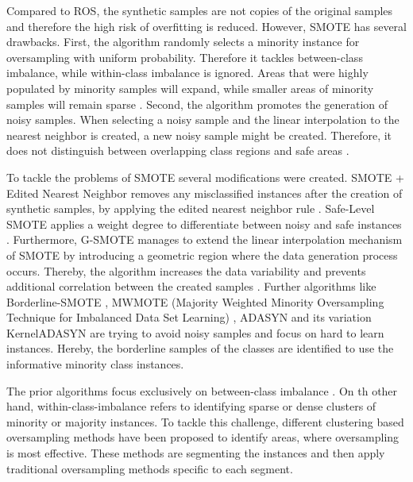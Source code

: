 \documentclass[parskip=full]{scrartcl}
\begin{document}
Compared to ROS, the synthetic samples are not copies of the original samples and therefore the high risk of overfitting is reduced. However, SMOTE has several drawbacks. First, the algorithm randomly selects a minority instance for oversampling with uniform probability. Therefore it tackles between-class imbalance, while within-class imbalance is ignored. Areas that were highly populated by minority samples will expand, while smaller areas of minority samples will remain sparse \cite{Prati2004}. Second, the algorithm promotes the generation of noisy samples. When selecting a noisy sample and the linear interpolation to the nearest neighbor is created, a new noisy sample might be created. Therefore, it does not distinguish between overlapping class regions and safe areas \cite{Bunkhumpornpat2009}.

To tackle the problems of SMOTE several modifications were created. SMOTE + Edited Nearest Neighbor removes any misclassified instances after the creation of synthetic samples, by applying the edited nearest neighbor rule \cite{Batista2004}. Safe-Level SMOTE applies a weight degree to differentiate between noisy and safe instances \cite{Bunkhumpornpat2009}. Furthermore, G-SMOTE manages to extend the linear interpolation mechanism of SMOTE by introducing a geometric region where the data generation process occurs. Thereby, the algorithm increases the data variability and prevents additional correlation between the created samples \cite{Douzas2019}. Further algorithms like Borderline-SMOTE \cite{Han2005}, MWMOTE (Majority Weighted Minority Oversampling Technique for Imbalanced Data Set Learning) \cite{Barua2014}, ADASYN and its variation KernelADASYN \cite{Tang2015} are trying to avoid noisy samples and focus on hard to learn instances. Hereby, the borderline samples of the classes are identified to use the informative minority class instances.

The prior algorithms focus exclusively on between-class imbalance \cite{Nekooeimehr2016}. On th other hand, within-class-imbalance refers to identifying sparse or dense clusters of minority or majority instances. To tackle this challenge, different clustering based oversampling methods have been proposed to identify areas, where oversampling is most effective. These methods are segmenting the instances and then apply traditional oversampling methods specific to each segment.
\end{document}
